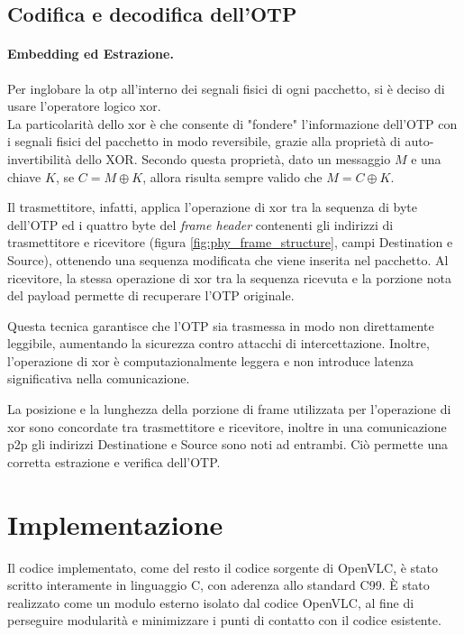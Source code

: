 \subsection{Codifica e decodifica dell'OTP}

\paragraph{Embedding ed Estrazione.}
Per inglobare la \gls{otp} all'interno dei segnali fisici di ogni pacchetto, si è deciso di usare l'operatore logico \gls{xor}\glsfirstoccur.\\
La particolarità dello \gls{xor} è che consente di "fondere" l'informazione dell'OTP con i segnali fisici del pacchetto in modo reversibile, grazie alla proprietà di auto-invertibilità dello XOR. Secondo questa proprietà, dato un messaggio \( M \) e una chiave \( K \), se \( C = M \oplus K \), allora risulta sempre valido che \( M = C \oplus K \).

Il trasmettitore, infatti, applica l'operazione di \gls{xor} tra la sequenza di byte dell'OTP ed i quattro byte del \textit{frame header} contenenti gli indirizzi di trasmettitore e ricevitore (figura \ref{fig:phy_frame_structure}, campi Destination e Source), ottenendo una sequenza modificata che viene inserita nel pacchetto. Al ricevitore, la stessa operazione di \gls{xor} tra la sequenza ricevuta e la porzione nota del payload permette di recuperare l'OTP originale.

Questa tecnica garantisce che l'OTP sia trasmessa in modo non direttamente leggibile, aumentando la sicurezza contro attacchi di intercettazione. Inoltre, l'operazione di \gls{xor} è computazionalmente leggera e non introduce latenza significativa nella comunicazione.

La posizione e la lunghezza della porzione di frame utilizzata per l'operazione di \gls{xor} sono concordate tra trasmettitore e ricevitore, inoltre in una comunicazione \gls{p2p} gli indirizzi Destinatione e Source sono noti ad entrambi. Ciò permette una corretta estrazione e verifica dell'OTP.


\section{Implementazione}
Il codice implementato, come del resto il codice sorgente di OpenVLC, è stato scritto interamente in linguaggio C, con aderenza allo standard C99. È stato realizzato come un modulo esterno isolato dal codice OpenVLC, al fine di perseguire modularità e minimizzare i punti di contatto con il codice esistente.


